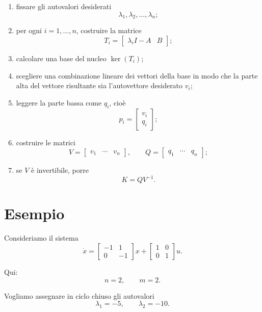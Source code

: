 \begin{enumerate}
    \item fissare gli autovalori desiderati
    \[
    \lambda_1,\lambda_2,\dots,\lambda_n;
    \]

    \item per ogni \(i=1,\dots,n\), costruire la matrice
    \[
    T_i=
    \begin{bmatrix}
    \lambda_i I-A & B
    \end{bmatrix};
    \]

    \item calcolare una base del nucleo \(\ker(T_i)\);

    \item scegliere una combinazione lineare dei vettori della base in modo che
    la parte alta del vettore risultante sia l'autovettore desiderato \(v_i\);

    \item leggere la parte bassa come \(q_i\), cioè
    \[
    p_i=
    \begin{bmatrix}
    v_i\\
    q_i
    \end{bmatrix};
    \]

    \item costruire le matrici
    \[
    V=
    \begin{bmatrix}
    v_1 & \cdots & v_n
    \end{bmatrix},
    \qquad
    Q=
    \begin{bmatrix}
    q_1 & \cdots & q_n
    \end{bmatrix};
    \]

    \item se \(V\) è invertibile, porre
    \[
    K=QV^{-1}.
    \]
\end{enumerate}

\section{Esempio}

Consideriamo il sistema
\[
\dot x=
\begin{bmatrix}
-1 & 1\\
0 & -1
\end{bmatrix}x
+
\begin{bmatrix}
1 & 0\\
0 & 1
\end{bmatrix}u.
\]

Qui:
\[
n=2,\qquad m=2.
\]

Vogliamo assegnare in ciclo chiuso gli autovalori
\[
\lambda_1=-5,\qquad \lambda_2=-10.
\]

